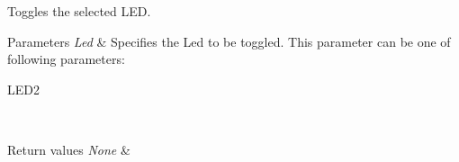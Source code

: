 Toggles the selected L\+ED. 


\begin{DoxyParams}{Parameters}
{\em Led} & Specifies the Led to be toggled. This parameter can be one of following parameters\+: \begin{DoxyItemize}
\item L\+E\+D2 \end{DoxyItemize}
\\
\hline
\end{DoxyParams}

\begin{DoxyRetVals}{Return values}
{\em None} & \\
\hline
\end{DoxyRetVals}
